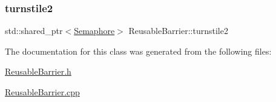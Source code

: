 \subsubsection{\texorpdfstring{turnstile2}{turnstile2}}
{\footnotesize\ttfamily std\+::shared\+\_\+ptr$<$\mbox{\hyperlink{class_semaphore}{Semaphore}}$>$ Reusable\+Barrier\+::turnstile2}



The documentation for this class was generated from the following files\+:\begin{DoxyCompactItemize}
\item 
\mbox{\hyperlink{_reusable_barrier_8h}{Reusable\+Barrier.\+h}}\item 
\mbox{\hyperlink{_reusable_barrier_8cpp}{Reusable\+Barrier.\+cpp}}\end{DoxyCompactItemize}
